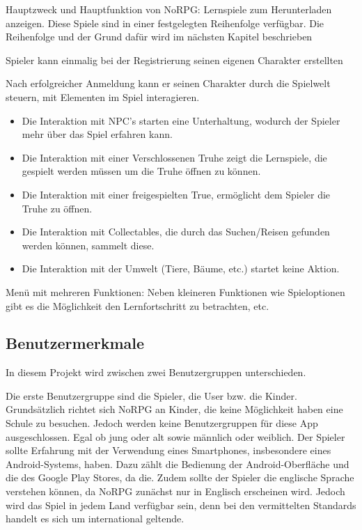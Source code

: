 		Hauptzweck und Hauptfunktion von NoRPG: Lernspiele zum Herunterladen anzeigen. Diese Spiele sind in einer festgelegten Reihenfolge verfügbar. Die Reihenfolge und der Grund dafür wird im nächsten Kapitel beschrieben
		
		Spieler kann einmalig bei der Registrierung seinen eigenen Charakter erstellten 
		
		Nach erfolgreicher Anmeldung kann er seinen Charakter durch die Spielwelt steuern, mit Elementen im Spiel interagieren.
		
		\begin{itemize}
			\item{Die Interaktion mit NPC's starten eine Unterhaltung, wodurch der Spieler mehr über das Spiel erfahren kann.}
			\item{Die Interaktion mit einer Verschlossenen Truhe zeigt die Lernspiele, die gespielt werden müssen um die Truhe öffnen zu können.}
			\item{Die Interaktion mit einer freigespielten True, ermöglicht dem Spieler die Truhe zu öffnen.}
			\item{Die Interaktion mit Collectables, die durch das Suchen/Reisen gefunden werden können, sammelt diese.}
			\item{Die Interaktion mit der Umwelt (Tiere, Bäume, etc.) startet keine Aktion.}
		\end{itemize}
		
		Menü mit mehreren Funktionen: Neben kleineren Funktionen wie Spieloptionen gibt es die Möglichkeit den Lernfortschritt zu betrachten, etc.
		
	
	\subsection{Benutzermerkmale}
		In diesem Projekt wird zwischen zwei Benutzergruppen unterschieden.
		
		Die erste Benutzergruppe sind die Spieler, die User bzw. die Kinder. Grundsätzlich richtet sich NoRPG an Kinder, die keine Möglichkeit haben eine Schule zu besuchen. Jedoch werden keine Benutzergruppen für diese App ausgeschlossen. Egal ob jung oder alt sowie männlich oder weiblich. %
		Der Spieler sollte Erfahrung mit der Verwendung eines Smartphones, insbesondere eines Android-Systems, haben. Dazu zählt die Bedienung der Android-Oberfläche und die des Google Play Stores, da die. Zudem sollte der Spieler die englische Sprache verstehen können, da NoRPG zunächst nur in Englisch erscheinen wird. Jedoch wird das Spiel in jedem Land verfügbar sein, denn bei den vermittelten Standards handelt es sich um international geltende.
		
